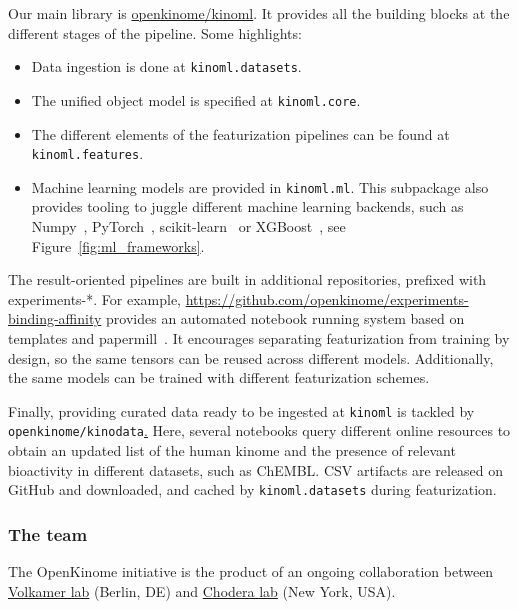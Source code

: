 \documentclass[9pt,lineno]{elife}
\begin{document}
Our main library is \href{https://github.com/openkinome/kinoml/}{openkinome/kinoml}. It provides all the building blocks at the different stages of the pipeline. Some highlights:

\begin{itemize}
    \item Data ingestion is done at \texttt{kinoml.datasets}.
    \item The unified object model is specified at \texttt{kinoml.core}.
    \item  The different elements of the featurization pipelines can be found at \texttt{kinoml.features}.
    \item Machine learning models are provided in \texttt{kinoml.ml}. This subpackage also provides tooling to juggle different machine learning backends, such as Numpy~\cite{harris_2020_nature}, PyTorch~\cite{paszke_2019_neurips}, scikit-learn~\cite{scikit-learn, sklearn_api} or XGBoost~\cite{chen_2016_xgboost}, see Figure~\ref{fig:ml_frameworks}.
\end{itemize}

The result-oriented pipelines are built in additional repositories, prefixed with experiments-*. For example, \href{https://github.com/openkinome/experiments-binding-affinity}{https://github.com/openkinome/experiments-binding-affinity} provides an automated notebook running system based on templates and papermill~\cite{papermill_May_2021}. It encourages separating featurization from training by design, so the same tensors can be reused across different models. Additionally, the same models can be trained with different featurization schemes.

Finally, providing curated data ready to be ingested at \texttt{kinoml} is tackled by \texttt{openkinome/kinodata}\href{https://github.com/openkinome/kinodata}. Here, several notebooks query different online resources to obtain an updated list of the human kinome and the presence of relevant bioactivity in different datasets, such as ChEMBL. CSV artifacts are released on GitHub and downloaded, and cached by \texttt{kinoml.datasets} during featurization.

\subsubsection{The team}

The OpenKinome initiative is the product of an ongoing collaboration between \href{https://volkamerlab.org/}{Volkamer lab} (Berlin, DE) and \href{https://www.choderalab.org/}{Chodera lab} (New York, USA).
\end{document}
